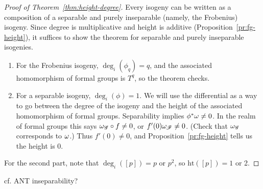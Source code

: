 \begin{proof}[Proof of Theorem~\ref{thm:height-degree}]
Every isogeny can be written as a composition of a separable and purely inseparable (namely, the Frobenius) isogeny. Since degree is multiplicative and height is additive (Proposition~\ref{pr:fg-height}), it suffices to show the theorem for separable and purely inseparable isogenies.
\begin{enumerate}
\item For the Frobenius isogeny, $\deg_i(\phi_q)=q$, and the associated homomorphism of formal groups is $T^q$, so the theorem checks.
\item For a separable isogeny, $\deg_i(\phi)=1$. We will use the differential as a way to go between the degree of the isogeny and the height of the associated homomorphism of formal groups. Separability implies $\phi^*\omega\ne 0$. In the realm of formal groups this says $\omega_{\mathscr{G}}\circ f\ne0$, or $f'(0)\omega_{\mathscr{F}}\ne 0$. (Check that $\omega_{\mathscr{G}}$ corresponds to $\omega$.) Thus $f'(0)\ne 0$, and Proposition~\ref{pr:fg-height} tells us the height is 0.
\end{enumerate}
For the second part, note that $\deg_i([p])=p$ or $p^2$, so $\text{ht}([p])=1$ or 2.
\end{proof}

cf. ANT inseparability?